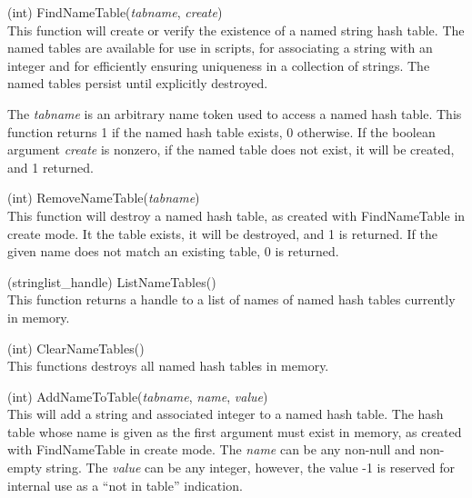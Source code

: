 \begin{description}
\item{(int) \vt FindNameTable({\it tabname\/}, {\it create\/})}\\
This function will create or verify the existence of a named string
hash table.  The named tables are available for use in scripts, for
associating a string with an integer and for efficiently ensuring
uniqueness in a collection of strings.  The named tables persist until
explicitly destroyed.

The {\it tabname} is an arbitrary name token used to access a named
hash table.  This function returns 1 if the named hash table exists, 0
otherwise.  If the boolean argument {\it create} is nonzero, if the
named table does not exist, it will be created, and 1 returned.

\item{(int) \vt RemoveNameTable({\it tabname\/})}\\
This function will destroy a named hash table, as created with {\vt
FindNameTable} in create mode.  It the table exists, it will be
destroyed, and 1 is returned.  If the given name does not match an
existing table, 0 is returned.

\item{(stringlist\_handle) \vt ListNameTables()}\\
This function returns a handle to a list of names of named hash tables
currently in memory.

\item{(int) \vt ClearNameTables()}\\
This functions destroys all named hash tables in memory.

\item{(int) \vt AddNameToTable({\it tabname\/}, {\it name\/}, {\it value\/})}\\
This will add a string and associated integer to a named hash table. 
The hash table whose name is given as the first argument must exist in
memory, as created with {\vt FindNameTable} in create mode.  The {\it
name} can be any non-null and non-empty string.  The {\it value} can
be any integer, however, the value -1 is reserved for internal use as
a ``not in table'' indication.


\end{description}
